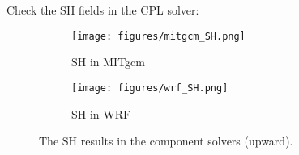
Check the SH fields in the CPL solver:

\begin{figure}[h!]
\centering
  \begin{subfigure}[b]{0.4\linewidth}
  \texttt{[image: figures/mitgcm\_SH.png]}
  \caption{SH in MITgcm}
  \end{subfigure}
  \begin{subfigure}[b]{0.4\linewidth}
  \texttt{[image: figures/wrf\_SH.png]}
  \caption{SH in WRF}
  \end{subfigure}
\caption{The SH results in the component solvers (upward).}
\label{fig:sh}
\end{figure}
